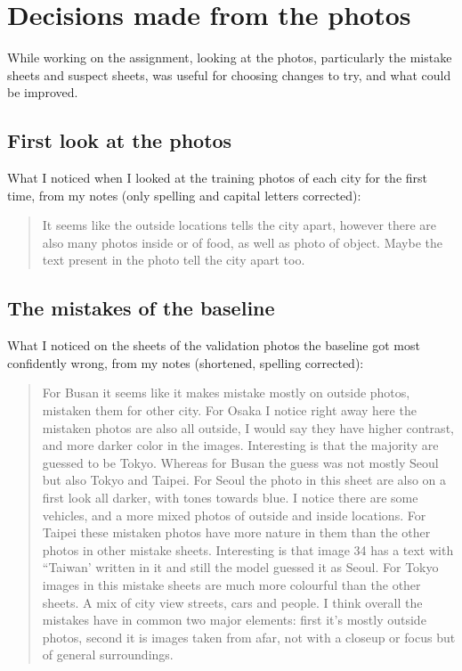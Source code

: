 \documentclass[11pt]{article}
\begin{document}
\section*{Decisions made from the photos}

While working on the assignment, looking at the photos, particularly the mistake sheets and suspect sheets, was useful for choosing changes to try, and what could be improved.

\subsection*{First look at the photos}
What I noticed when I looked at the training photos of each city for the first time, from my notes (only spelling and capital letters corrected):
\begin{quote}\small
It seems like the outside locations tells the city apart, however there are also many photos inside or of food, as well as photo of object. Maybe the text present in the photo tell the city apart too.
\end{quote}

\subsection*{The mistakes of the baseline}
What I noticed on the sheets of the validation photos the baseline got most confidently wrong, from my notes (shortened, spelling corrected):
\begin{quote}\small
For Busan it seems like it makes mistake mostly on outside photos, mistaken them for other city. For Osaka I notice right away here the mistaken photos are also all outside, I would say they have higher contrast, and more darker color in the images. Interesting is that the majority are guessed to be Tokyo. Whereas for Busan the guess was not mostly Seoul but also Tokyo and Taipei. For Seoul the photo in this sheet are also on a first look all darker, with tones towards blue. I notice there are some vehicles, and a more mixed photos of outside and inside locations. For Taipei these mistaken photos have more nature in them than the other photos in other mistake sheets. Interesting is that image 34 has a text with “Taiwan’ written in it and still the model guessed it as Seoul. For Tokyo  images in this mistake sheets are much more colourful than the other sheets. A mix of city view streets, cars and people. I think overall the mistakes have in common two major elements: first it's mostly outside photos, second it is images taken from afar, not with a closeup or focus but of general surroundings.
\end{quote}
\end{document}
